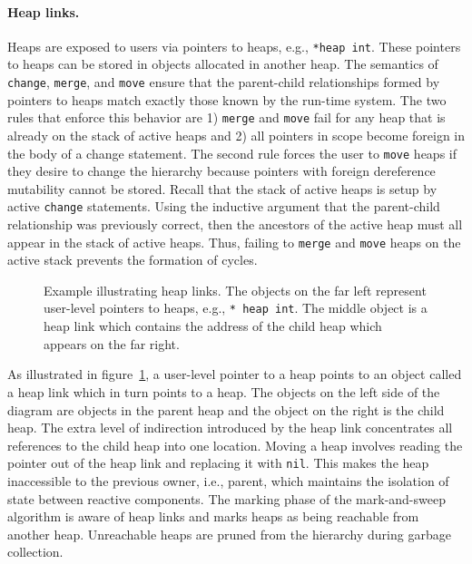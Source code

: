\paragraph{Heap links.}
Heaps are exposed to users via pointers to heaps, e.g., \verb+*heap int+.
These pointers to heaps can be stored in objects allocated in another heap.
The semantics of \verb+change+, \verb+merge+, and \verb+move+ ensure that the parent-child relationships formed by pointers to heaps match exactly those known by the run-time system.
The two rules that enforce this behavior are 1) \verb+merge+ and \verb+move+ fail for any heap that is already on the stack of active heaps and 2) all pointers in scope become foreign in the body of a change statement.
The second rule forces the user to \verb+move+ heaps if they desire to change the hierarchy because pointers with foreign dereference mutability cannot be stored.
Recall that the stack of active heaps is setup by active \verb+change+ statements.
Using the inductive argument that the parent-child relationship was previously correct, then the ancestors of the active heap must all appear in the stack of active heaps.
Thus, failing to \verb+merge+ and \verb+move+ heaps on the active stack prevents the formation of cycles.

\begin{figure}
\centering
\cprotect\caption{Example illustrating heap links\label{heap_link}.  The objects on the far left represent user-level pointers to heaps, e.g., \verb+* heap int+.  The middle object is a heap link which contains the address of the child heap which appears on the far right.}
\end{figure}

As illustrated in figure~\ref{heap_link}, a user-level pointer to a heap points to an object called a heap link which in turn points to a heap.
The objects on the left side of the diagram are objects in the parent heap and the object on the right is the child heap.
The extra level of indirection introduced by the heap link concentrates all references to the child heap into one location.
Moving a heap involves reading the pointer out of the heap link and replacing it with \verb+nil+.
This makes the heap inaccessible to the previous owner, i.e., parent, which maintains the isolation of state between reactive components.
The marking phase of the mark-and-sweep algorithm is aware of heap links and marks heaps as being reachable from another heap.
Unreachable heaps are pruned from the hierarchy during garbage collection.

